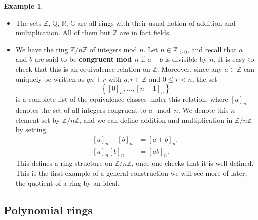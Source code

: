 \documentclass{article}
\newcommand{\Z}{\mathbb{Z}}
\newcommand{\Q}{\mathbb{Q}}
\newcommand{\R}{\mathbb{R}}
\newcommand{\C}{\mathbb{C}}
\renewcommand{\sb}[1]{\left[ #1 \right]}
\newcommand{\cb}[1]{\left\{ #1 \right\}}
\theoremstyle{definition}\newtheorem{definition}{Definition}[subsection]
\theoremstyle{definition}\newtheorem{remark}[definition]{Remark}
\theoremstyle{definition}\newtheorem*{example}{Example}
\theoremstyle{definition}\newtheorem*{note}{Note}
\begin{document}
\begin{example}
\hfill
\begin{itemize}
\item The sets $ \Z $, $ \Q $, $ \R $, $ \C $ are all rings with their usual notion of addition and multiplication. All of them but $ \Z $ are in fact fields.
\item We have the ring $ \Z / n\Z $ of integers mod $ n $. Let $ n \in \Z_{> 0} $, and recall that $ a $ and $ b $ are said to be \textbf{congruent mod $ n $} if $ a - b $ is divisible by $ n $. It is easy to check that this is an equivalence relation on $ \Z $. Moreover, since any $ a \in \Z $ can uniquely be written as $ qn + r $ with $ q, r \in \Z $ and $ 0 \le r < n $, the set
$$ \cb{\sb{0}_n, \dots, \sb{n - 1}_n} $$
is a complete list of the equivalence classes under this relation, where $ \sb{a}_n $ denotes the set of all integers congruent to $ a \mod n $. We denote this $ n $-element set by $ \Z / n\Z $, and we can define addition and multiplication in $ \Z / n\Z $ by setting
\begin{align*}
\sb{a}_n + \sb{b}_n & = \sb{a + b}_n, \\
\sb{a}_n\sb{b}_n & = \sb{ab}_n.
\end{align*}
This defines a ring structure on $ \Z / n\Z $, once one checks that it is well-defined. This is the first example of a general construction we will see more of later, the quotient of a ring by an ideal.
\end{itemize}
\end{example}


\subsection{Polynomial rings}
\end{document}

